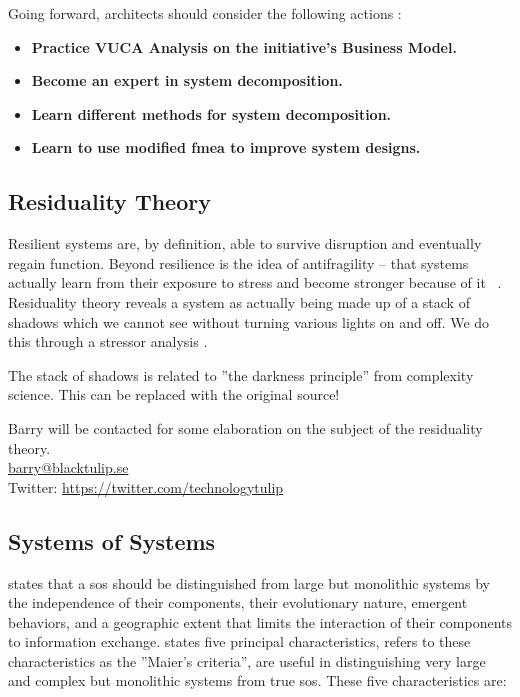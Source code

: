 Going forward, architects should consider the following actions \parencite[p. 889]{OReilly2019}:
\begin{itemize}
	\item{\textbf{Practice VUCA Analysis on the initiative's Business Model.}}
	\item{\textbf{Become an expert in system decomposition.}}
	\item{\textbf{Learn different methods for system decomposition.}}
	\item{\textbf{Learn to use modified \acrshort{fmea} to improve system designs.}}
\end{itemize}

\subsection{Residuality Theory}
\label{sub:sfresiduality}
Resilient systems are, by definition, able to survive disruption and eventually regain function. Beyond resilience is the
idea of antifragility – that systems actually learn from their exposure to stress and become stronger because of it \parencite{Taleb2012}\ \parencite[p. 876]{OReilly2020}. Residuality theory reveals a system as actually being made up of a stack of shadows which we cannot see without turning various lights on and off. We do this through a stressor analysis \parencite[p. 877]{OReilly2020}.

\begin{remark}
	The stack of shadows is related to ''the darkness principle'' \parencite[p. 78]{Richardson2004} from complexity science. This can be replaced with the original source!
\end{remark}

\begin{remark}
	Barry will be contacted for some elaboration on the subject of the residuality theory.\\
	\href{mailto:barry@blacktulip.se}{barry@blacktulip.se}\\
	Twitter: \href{https://twitter.com/technologytulip}{https://twitter.com/technologytulip}
\end{remark}

\subsection{Systems of Systems}
\label{sub:systemsofsystems}

\textcite{Maier1996} states that a \acrfull{sos} should be distinguished from large but monolithic systems by the independence of their components, their evolutionary nature, emergent behaviors, and a geographic extent that limits the interaction of their components to information exchange. \textcite{Maier1996} states five principal characteristics, \textcite{Dersin2014} refers to these characteristics as the ''Maier’s criteria'', are useful in distinguishing very large and complex but monolithic systems from true \acrshort{sos}. These five characteristics are:

